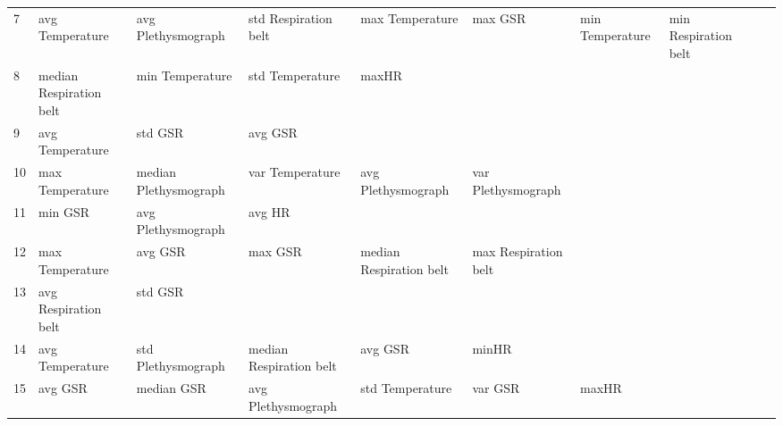 \begin{landscape}
\begin{table}[]
\begin{tabular}{l|llllllll}
7        & avg Temperature         & avg Plethysmograph      & std Respiration belt    & max Temperature         & max GSR                 & min Temperature       & min Respiration belt    &                         &                         &         \\
8        & median Respiration belt & min Temperature         & std Temperature         & maxHR                   &                         &                       &                         &                         &                         &         \\
9        & avg Temperature         & std GSR                 & avg GSR                 &                         &                         &                       &                         &                         &                         &         \\
10       & max Temperature         & median Plethysmograph   & var Temperature         & avg Plethysmograph      & var Plethysmograph      &                       &                         &                         &                         &         \\
11       & min GSR                 & avg Plethysmograph      & avg HR                  &                         &                         &                       &                         &                         &                         &         \\
12       & max Temperature         & avg GSR                 & max GSR                 & median Respiration belt & max Respiration belt    &                       &                         &                         &                         &         \\
13       & avg Respiration belt    & std GSR                 &                         &                         &                         &                       &                         &                         &                         &         \\
14       & avg Temperature         & std Plethysmograph      & median Respiration belt & avg GSR                 & minHR                   &                       &                         &                         &                         &         \\
15       & avg GSR                 & median GSR              & avg Plethysmograph      & std Temperature         & var GSR                 & maxHR                 &                         &                         &                         &         \\

\end{tabular}
\end{table}
\end{landscape}
